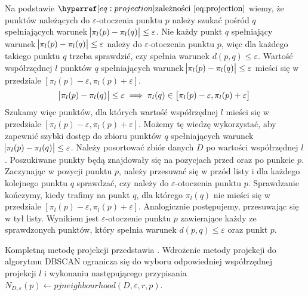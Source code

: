 Na podstawie $ \myhyperref{eq:projection}{zależności} $ wiemy, że punktów należących do $ \varepsilon $-otoczenia punktu $ p $ należy szukać pośród $ q $ spełniających warunek \mbox{$ \abs{\pi_l(p) - \pi_l(q)} \le \varepsilon $}. Nie każdy punkt $ q $ spełniający warunek $ \abs{\pi_l(p) - \pi_l(q)} \le \varepsilon $ należy do \linebreak$ \varepsilon $-otoczenia punktu $ p $, więc dla każdego takiego punktu $ q $ trzeba sprawdzić, czy spełnia warunek $ d(p,q) \le \varepsilon $. Wartość współrzędnej $ l $ punktów $ q $ spełniających warunek $ \abs{\pi_l(p) - \pi_l(q)} \le \varepsilon $ mieści się w przedziale $ \left[\pi_l(p)-\varepsilon,\pi_l(p)+\varepsilon\right] $.
\begin{equation}
	\abs{\pi_l(p) - \pi_l(q)} \le \varepsilon \implies \pi_l(q) \in \left[\pi_l(p)-\varepsilon,\pi_l(p)+\varepsilon\right]
\end{equation}
Szukamy więc punktów, dla których wartość współrzędnej $ l $ mieści się w przedziale $ \left[\pi_l(p)-\varepsilon,\pi_l(p)+\varepsilon\right] $. Możemy tę wiedzę wykorzystać, aby zapewnić szybki dostęp do zbioru punktów $ q $ spełniających warunek $ \abs{\pi_l(p) - \pi_l(q)} \le \varepsilon $. Należy posortować zbiór danych $ D $ po wartości współrzędnej $ l $. Poszukiwane punkty będą znajdowały się na pozycjach przed oraz po punkcie $ p $. Zaczynając w pozycji punktu $ p $, należy przesuwać się w przód listy i dla każdego kolejnego punktu $ q $ sprawdzać, czy należy do $ \varepsilon $-otoczenia punktu $ p $. Sprawdzanie kończymy, kiedy trafimy na punkt $ q $, dla którego $ \pi_l(q) $ nie mieści się w przedziale $ \left[\pi_l(p)-\varepsilon,\pi_l(p)+\varepsilon\right] $. Analogicznie postępujemy, przesuwając się w tył listy. Wynikiem jest $ \varepsilon $-otoczenie punktu $ p $ zawierające każdy ze sprawdzonych punktów, który spełnia warunek $ d(p,q) \le \varepsilon $ oraz punkt $ p $.

Kompletną metodę projekcji przedstawia . Wdrożenie metody projekcji do algorytmu DBSCAN ogranicza się do wyboru odpowiedniej współrzędnej projekcji $ l $ i wykonaniu następującego przypisania \linebreak\mbox{$ N_{D,\varepsilon}(p) \gets pjneighbourhood(D, \varepsilon, r, p) $.}

